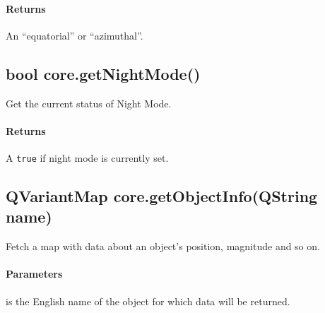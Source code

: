 \paragraph{Returns}
An ``equatorial'' or ``azimuthal''.

\subsection{bool core.getNightMode()}
\label{sec:ScriptingAPI:core:getNightMode}
Get the current status of Night Mode.

\paragraph{Returns}
A \texttt{true} if night mode is currently set.

\subsection{QVariantMap core.getObjectInfo(QString name)}
\label{sec:ScriptingAPI:core:getObjectInfo}
Fetch a map with data about an object's position, magnitude and so on.

\paragraph{Parameters}
\begin{description}[align=right,labelwidth=3cm,leftmargin=3.2cm]
\item[\parameter{name}] is the English name of the object for which data will be returned.
\end{description}

